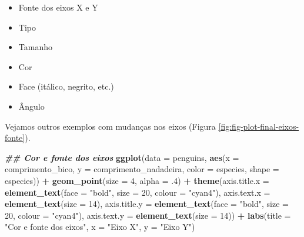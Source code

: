 \documentclass[
]{article}
\newenvironment{Shaded}{\begin{snugshade}}{\end{snugshade}}
\newcommand{\AttributeTok}[1]{\textcolor[rgb]{0.13,0.29,0.53}{#1}}
\newcommand{\DecValTok}[1]{\textcolor[rgb]{0.00,0.00,0.81}{#1}}
\newcommand{\DocumentationTok}[1]{\textcolor[rgb]{0.56,0.35,0.01}{\textbf{\textit{#1}}}}
\newcommand{\FunctionTok}[1]{\textcolor[rgb]{0.13,0.29,0.53}{\textbf{#1}}}
\newcommand{\NormalTok}[1]{#1}
\newcommand{\SpecialCharTok}[1]{\textcolor[rgb]{0.81,0.36,0.00}{\textbf{#1}}}
\newcommand{\StringTok}[1]{\textcolor[rgb]{0.31,0.60,0.02}{#1}}
\providecommand{\tightlist}{%
  \setlength{\itemsep}{0pt}\setlength{\parskip}{0pt}}
\begin{document}
\begin{itemize}
\tightlist
\item
  Fonte dos eixos X e Y
\item
  Tipo
\item
  Tamanho
\item
  Cor
\item
  Face (itálico, negrito, etc.)
\item
  Ângulo
\end{itemize}

Vejamos outros exemplos com mudanças nos eixos (Figura \ref{fig:fig-plot-final-eixos-fonte}).

\begin{Shaded}
\begin{Highlighting}[]
\DocumentationTok{\#\# Cor e fonte dos eixos}
\FunctionTok{ggplot}\NormalTok{(}\AttributeTok{data =}\NormalTok{ penguins, }
       \FunctionTok{aes}\NormalTok{(}\AttributeTok{x =}\NormalTok{ comprimento\_bico, }\AttributeTok{y =}\NormalTok{ comprimento\_nadadeira,}
           \AttributeTok{color =}\NormalTok{ especies, }\AttributeTok{shape =}\NormalTok{ especies)) }\SpecialCharTok{+}
    \FunctionTok{geom\_point}\NormalTok{(}\AttributeTok{size =} \DecValTok{4}\NormalTok{, }\AttributeTok{alpha =}\NormalTok{ .}\DecValTok{4}\NormalTok{) }\SpecialCharTok{+}
    \FunctionTok{theme}\NormalTok{(}\AttributeTok{axis.title.x =} \FunctionTok{element\_text}\NormalTok{(}\AttributeTok{face =} \StringTok{"bold"}\NormalTok{, }\AttributeTok{size =} \DecValTok{20}\NormalTok{, }\AttributeTok{colour =} \StringTok{"cyan4"}\NormalTok{),}
          \AttributeTok{axis.text.x =} \FunctionTok{element\_text}\NormalTok{(}\AttributeTok{size =} \DecValTok{14}\NormalTok{),}
          \AttributeTok{axis.title.y =} \FunctionTok{element\_text}\NormalTok{(}\AttributeTok{face =} \StringTok{"bold"}\NormalTok{, }\AttributeTok{size =} \DecValTok{20}\NormalTok{, }\AttributeTok{colour =} \StringTok{"cyan4"}\NormalTok{),}
          \AttributeTok{axis.text.y =} \FunctionTok{element\_text}\NormalTok{(}\AttributeTok{size =} \DecValTok{14}\NormalTok{)) }\SpecialCharTok{+}
    \FunctionTok{labs}\NormalTok{(}\AttributeTok{title =} \StringTok{"Cor e fonte dos eixos"}\NormalTok{, }\AttributeTok{x =} \StringTok{"Eixo X"}\NormalTok{, }\AttributeTok{y =} \StringTok{"Eixo Y"}\NormalTok{)}
\end{Highlighting}
\end{Shaded}
\end{document}
